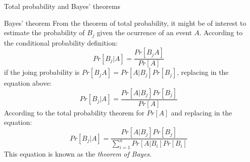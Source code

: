 \documentclass[8pt]{beamer}
\begin{document}
\begin{frame}{Total probability and Bayes' theorems}
    \begin{block}{Bayes' theorem}
        From the theorem of total probability, it might be of interest to estimate the probability of $B_j$ given the ocurrence of an event $A$. According to the conditional probability definition:
        $$
        Pr[B_j | A] = \frac{Pr[B_j A]}{Pr[A]}
        $$
        if the joing probability is $Pr[B_j A] = Pr[A | B_j] Pr[B_j]$, replacing in the equation above:
        $$
        Pr[B_j | A] = \frac{Pr[A | B_j] Pr[B_j]}{Pr[A]}
        $$
        According to the total probability theorem for $Pr[A]$ and replacing in the equation:
        $$
        Pr[B_j | A] = \frac{Pr[A | B_j] Pr[B_j]}{\sum_{i=1}^{n} Pr[A | B_i ] Pr[B_i]}
        $$
        This equation is known as the \emph{theorem of Bayes}. 
    \end{block}
\end{frame}
\end{document}
